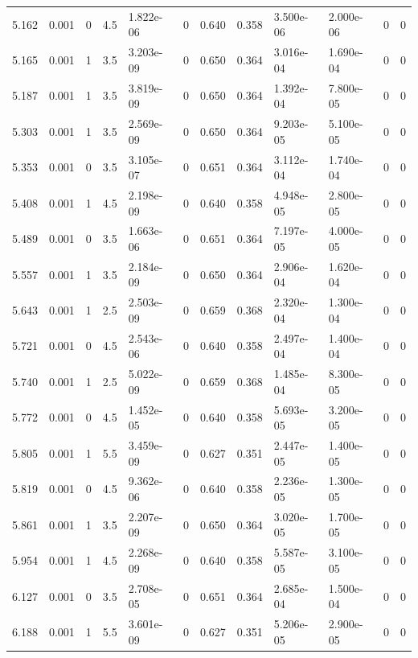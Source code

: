 \documentclass[preview]{standalone}
\begin{document}
{{{\begin{tabular}{L{1.2cm}C{1.2cm} C{0.3cm}C{0.5cm} C{1.4cm}C{1.4cm} C{1.4cm}C{1.4cm} C{1.6cm}C{1.6cm} C{1.6cm}C{1.6cm}}
  5.162  &  0.001  & 0     & 4.5 &  1.822e-06  & 0  &  0.640&   0.358& 3.500e-06 & 2.000e-06   &  0 & 0  \\ 
  5.165  &  0.001  & 1     & 3.5 &  3.203e-09  & 0  &  0.650&   0.364& 3.016e-04 & 1.690e-04   &  0 & 0  \\ 
  5.187  &  0.001  & 1     & 3.5 &  3.819e-09  & 0  &  0.650&   0.364& 1.392e-04 & 7.800e-05   &  0 & 0  \\ 
  5.303  &  0.001  & 1     & 3.5 &  2.569e-09  & 0  &  0.650&   0.364& 9.203e-05 & 5.100e-05   &  0 & 0  \\ 
  5.353  &  0.001  & 0     & 3.5 &  3.105e-07  & 0  &  0.651&   0.364& 3.112e-04 & 1.740e-04   &  0 & 0  \\ 
  5.408  &  0.001  & 1     & 4.5 &  2.198e-09  & 0  &  0.640&   0.358& 4.948e-05 & 2.800e-05   &  0 & 0  \\ 
  5.489  &  0.001  & 0     & 3.5 &  1.663e-06  & 0  &  0.651&   0.364& 7.197e-05 & 4.000e-05   &  0 & 0  \\ 
  5.557  &  0.001  & 1     & 3.5 &  2.184e-09  & 0  &  0.650&   0.364& 2.906e-04 & 1.620e-04   &  0 & 0  \\ 
  5.643  &  0.001  & 1     & 2.5 &  2.503e-09  & 0  &  0.659&   0.368& 2.320e-04 & 1.300e-04   &  0 & 0  \\ 
  5.721  &  0.001  & 0     & 4.5 &  2.543e-06  & 0  &  0.640&   0.358& 2.497e-04 & 1.400e-04   &  0 & 0  \\ 
  5.740  &  0.001  & 1     & 2.5 &  5.022e-09  & 0  &  0.659&   0.368& 1.485e-04 & 8.300e-05   &  0 & 0  \\ 
  5.772  &  0.001  & 0     & 4.5 &  1.452e-05  & 0  &  0.640&   0.358& 5.693e-05 & 3.200e-05   &  0 & 0  \\ 
  5.805  &  0.001  & 1     & 5.5 &  3.459e-09  & 0  &  0.627&   0.351& 2.447e-05 & 1.400e-05   &  0 & 0  \\ 
  5.819  &  0.001  & 0     & 4.5 &  9.362e-06  & 0  &  0.640&   0.358& 2.236e-05 & 1.300e-05   &  0 & 0  \\ 
  5.861  &  0.001  & 1     & 3.5 &  2.207e-09  & 0  &  0.650&   0.364& 3.020e-05 & 1.700e-05   &  0 & 0  \\ 
  5.954  &  0.001  & 1     & 4.5 &  2.268e-09  & 0  &  0.640&   0.358& 5.587e-05 & 3.100e-05   &  0 & 0  \\ 
  6.127  &  0.001  & 0     & 3.5 &  2.708e-05  & 0  &  0.651&   0.364& 2.685e-04 & 1.500e-04   &  0 & 0  \\ 
  6.188  &  0.001  & 1     & 5.5 &  3.601e-09  & 0  &  0.627&   0.351& 5.206e-05 & 2.900e-05   &  0 & 0  \\ 

\end{tabular}}}}
\end{document}
